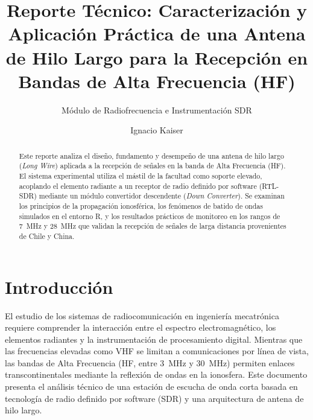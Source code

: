 \documentclass[runningheads]{llncs}
\begin{document}
\title{Reporte Técnico: Caracterización y Aplicación Práctica de una Antena de Hilo Largo para la Recepción en Bandas de Alta Frecuencia (HF)}

\subtitle{Módulo de Radiofrecuencia e Instrumentación SDR}

\author{Ignacio Kaiser}



\maketitle

\begin{abstract}
Este reporte analiza el diseño, fundamento y desempeño de una antena de hilo largo (\textit{Long Wire}) aplicada a la recepción de señales en la banda de Alta Frecuencia (HF). El sistema experimental utiliza el mástil de la facultad como soporte elevado, acoplando el elemento radiante a un receptor de radio definido por software (RTL-SDR) mediante un módulo convertidor descendente (\textit{Down Converter}). Se examinan los principios de la propagación ionosférica, los fenómenos de batido de ondas simulados en el entorno R, y los resultados prácticos de monitoreo en los rangos de 7~MHz y 28~MHz que validan la recepción de señales de larga distancia provenientes de Chile y China.

\end{abstract}

\section{Introducción}
El estudio de los sistemas de radiocomunicación en ingeniería mecatrónica requiere comprender la interacción entre el espectro electromagnético, los elementos radiantes y la instrumentación de procesamiento digital. Mientras que las frecuencias elevadas como VHF se limitan a comunicaciones por línea de vista, las bandas de Alta Frecuencia (HF, entre 3~MHz y 30~MHz) permiten enlaces transcontinentales mediante la reflexión de ondas en la ionosfera. Este documento presenta el análisis técnico de una estación de escucha de onda corta basada en tecnología de radio definido por software (SDR) y una arquitectura de antena de hilo largo.
\end{document}

